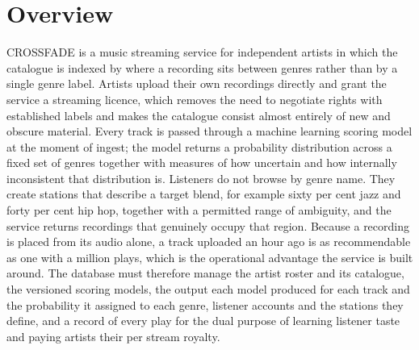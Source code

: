 \documentclass[11pt]{article}
\newcommand{\rae}[1]{\textcolor{ascc}{#1}}
\begin{document}
\vspace{6pt}
\noindent{}

\clearpage
\section{Overview}\label{sec:ra}

CROSSFADE is a music streaming service for independent \rae{artists} in which the catalogue is indexed by where a \rae{recording} sits between \rae{genres} rather than by a single \rae{genre} label. \rae{Artists} upload their own \rae{recordings} directly and grant the service a streaming licence, which removes the need to negotiate rights with established labels and makes the catalogue consist almost entirely of new and obscure material. Every \rae{track} is passed through a machine learning \rae{scoring model} at the moment of ingest; the model returns a probability distribution across a fixed set of \rae{genres} together with measures of how uncertain and how internally inconsistent that distribution is. \rae{Listeners} do not browse by \rae{genre} name. They create \rae{stations} that describe a \rae{target blend}, for example sixty per cent jazz and forty per cent hip hop, together with a permitted range of ambiguity, and the service returns \rae{recordings} that genuinely occupy that region. Because a \rae{recording} is placed from its audio alone, a \rae{track} uploaded an hour ago is as recommendable as one with a million \rae{plays}, which is the operational advantage the service is built around. The database must therefore manage the \rae{artist} roster and its catalogue, the versioned \rae{scoring models}, \rae{the output each model produced for each track} and \rae{the probability it assigned to each genre}, \rae{listener} accounts and the \rae{stations} they define, and a record of every \rae{play} for the dual purpose of learning \rae{listener} taste and paying \rae{artists} their per stream royalty.
\end{document}
